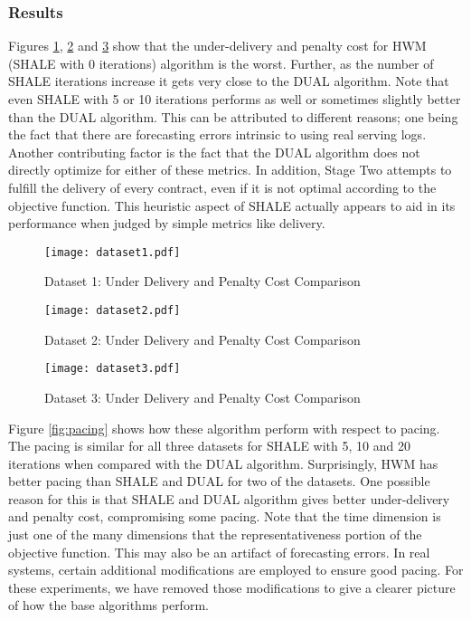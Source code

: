 \subsubsection{Results}
Figures \ref{fig:dataset1}, \ref{fig:dataset2} and \ref{fig:dataset3} show that the 
under-delivery and penalty cost for HWM (SHALE with 0 iterations) algorithm 
is the worst. Further, as the number of SHALE iterations increase it gets very close to the DUAL
algorithm. Note that even SHALE with 5 or 10 iterations performs as well or sometimes 
slightly better than the DUAL algorithm. This can be attributed to different reasons;
one being the fact that there are forecasting errors intrinsic to using real serving logs. 
Another contributing factor is the fact that the DUAL algorithm does not
directly optimize for either of these metrics.
In addition, Stage Two
attempts to fulfill the delivery of every contract, even if it is not optimal according to the objective
function.  This heuristic aspect of SHALE actually appears to aid in its performance when judged by
simple metrics like delivery.

\begin{figure}[h!]
\centering
\texttt{[image: dataset1.pdf]}
\caption{Dataset 1: Under Delivery and Penalty Cost Comparison}
\label{fig:dataset1}
\end{figure}

\begin{figure}[h!]
\centering
\texttt{[image: dataset2.pdf]}
\caption{Dataset 2: Under Delivery and Penalty Cost Comparison}
\label{fig:dataset2}
\end{figure}

\begin{figure}[h!]
\centering
\texttt{[image: dataset3.pdf]}
\caption{Dataset 3: Under Delivery and Penalty Cost Comparison}
\label{fig:dataset3}
\end{figure}

Figure \ref{fig:pacing} shows how these algorithm perform with respect to pacing.
The pacing is similar for all three datasets for SHALE with 5, 10 and 20 iterations when compared with 
the DUAL algorithm.  Surprisingly, HWM has better pacing than SHALE and DUAL for two of the datasets.
One possible reason for this is that SHALE and DUAL algorithm gives better under-delivery and 
penalty cost, compromising some pacing. Note that the time dimension is just one of the many dimensions
that the representativeness portion of the objective function.
This may also be an artifact of forecasting errors.  In real systems, certain additional modifications are employed
to ensure good pacing.  For these experiments, we have removed those modifications to give a clearer picture of
how the base algorithms perform.


